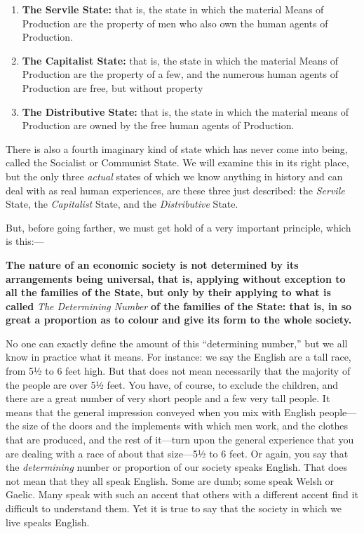 \documentclass{book}
\begin{document}
\begin{enumerate}
	\item \textbf{The Servile State:} that is, the state in which the material Means of Production are the property of men who also own the human agents of Production.

	\item \textbf{The Capitalist State:} that is, the state in which the material Means of Production are the property of a few, and the numerous human agents of Production are free, but without property

	\item \textbf{The Distributive State:} that is, the state in which the material means of Production are owned by the free human agents of Production.

\end{enumerate}
There is also a fourth imaginary kind of state which has never come into being, called the Socialist or Communist State. We will examine this in its right place, but the only three \emph{actual} states of which we know anything in history and can deal with as real human experiences, are these three just described: the \emph{Servile} State, the \emph{Capitalist} State, and the \emph{Distributive} State.

But, before going farther, we must get hold of a very important principle, which is this:—

\textbf{The nature of an economic society is not determined by its arrangements being universal, that is, applying without exception to all the families of the State, but only by their applying to what is called} \emph{The Determining Number} \textbf{of the families of the State: that is, in so great a proportion as to colour and give its form to the whole society.}

No one can exactly define the amount of this “determining number,” but we all know in practice what it means. For instance: we say the English are a tall race, from 5½ to 6 feet high. But that does not mean necessarily that the majority of the people are over 5½ feet. You have, of course, to exclude the children, and there are a great number of very short people and a few very tall people. It means that the general impression conveyed when you mix with English people—the size of the doors and the implements with which men work, and the clothes that are produced, and the rest of it—turn upon the general experience that you are dealing with a race of about that size—5½ to 6 feet. Or again, you say that the \emph{determining} number or proportion of our society speaks English. That does not mean that they all speak English. Some are dumb; some speak Welsh or Gaelic. Many speak with such an accent that others with a different accent find it difficult to understand them. Yet it is true to say that the society in which we live speaks English.
\end{document}
